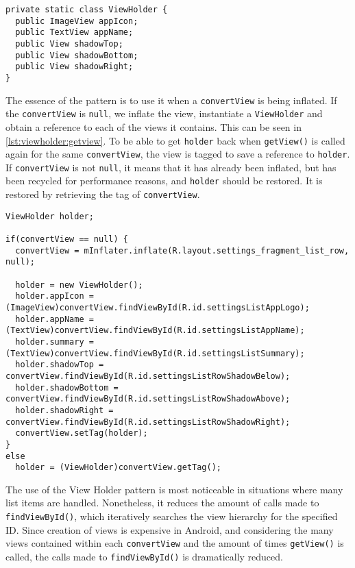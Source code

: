\begin{lstlisting}[caption={The intent filter and action a \giraf application has to provide to be shown in settings.}, label={lst:viewholder}]
private static class ViewHolder {
  public ImageView appIcon;
  public TextView appName;
  public View shadowTop;
  public View shadowBottom;
  public View shadowRight;
}
\end{lstlisting}

The essence of the pattern is to use it when a \lstinline|convertView| is being inflated.
If the \lstinline|convertView| is \lstinline|null|, we inflate the view, instantiate a \lstinline|ViewHolder| and obtain a reference to each of the views it contains.
This can be seen in \cref{lst:viewholder:getview}.
To be able to get \lstinline|holder| back when \lstinline|getView()| is called again for the same \lstinline|convertView|, the view is tagged to save a reference to \lstinline|holder|.
If \lstinline|convertView| is not \lstinline|null|, it means that it has already been inflated, but has been recycled for performance reasons, and \lstinline|holder| should be restored.
It is restored by retrieving the tag of \lstinline|convertView|.

\begin{lstlisting}[caption={Excerpt of the refactored \lstinline|getView()| method in \lstinline|SettingsListAdapter|.}, label={lst:viewholder:getview}]
ViewHolder holder;

if(convertView == null) {
  convertView = mInflater.inflate(R.layout.settings_fragment_list_row, null);

  holder = new ViewHolder();
  holder.appIcon = (ImageView)convertView.findViewById(R.id.settingsListAppLogo);
  holder.appName = (TextView)convertView.findViewById(R.id.settingsListAppName);
  holder.summary = (TextView)convertView.findViewById(R.id.settingsListSummary);
  holder.shadowTop = convertView.findViewById(R.id.settingsListRowShadowBelow);
  holder.shadowBottom = convertView.findViewById(R.id.settingsListRowShadowAbove);
  holder.shadowRight = convertView.findViewById(R.id.settingsListRowShadowRight);
  convertView.setTag(holder);
}
else
  holder = (ViewHolder)convertView.getTag();
\end{lstlisting}

The use of the View Holder pattern is most noticeable in situations where many list items are handled.
Nonetheless, it reduces the amount of calls made to \lstinline|findViewById()|, which iteratively searches the view hierarchy for the specified ID.
Since creation of views is expensive in Android, and considering the many views contained within each \lstinline|convertView| and the amount of times \lstinline|getView()| is called, the calls made to  \lstinline|findViewById()| is dramatically reduced\cite{understandingAdapters}.

